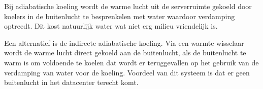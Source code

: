Bij adiabatische koeling wordt de warme lucht uit de serverruimte gekoeld door koelers in de buitenlucht te besprenkelen met water waardoor verdamping optreedt. Dit kost natuurlijk water wat niet erg milieu vriendelijk is.

Een alternatief is de indirecte adiabatische koeling. Via een warmte wisselaar wordt de warme lucht direct gekoeld aan de buitenlucht, als de buitenlucht te warm is om voldoende te koelen dat wordt er teruggevallen op het gebruik van de verdamping van water voor de koeling. Voordeel van dit systeem is dat er geen buitenlucht in het datacenter terecht komt.
